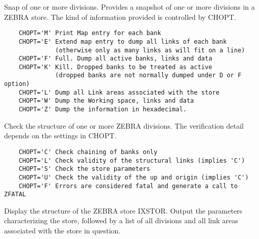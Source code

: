 \ENDCMD


\BEGARG
{}
\ENDARG

   \par
Snap of one or more divisions.  Provides a snapshot of one or more 
   divisions in a ZEBRA store.  The kind of information provided is controlled 
   by CHOPT.  
\begin{verbatim}
    CHOPT='M' Print Map entry for each bank
    CHOPT='E' Extend map entry to dump all links of each bank
              (otherwise only as many links as will fit on a line)
    CHOPT='F' Full. Dump all active banks, links and data
    CHOPT='K' Kill. Dropped banks to be treated as active
              (dropped banks are not normally dumped under D or F option)
    CHOPT='L' Dump all Link areas associated with the store
    CHOPT='W' Dump the Working space, links and data
    CHOPT='Z' Dump the information in hexadecimal.
\end{verbatim}

\ENDCMD


\BEGARG
{}
\ENDARG

   \par
Check the structure of one or more ZEBRA divisions.  The verification 
   detail depends on the settings in CHOPT.  
\begin{verbatim}
    CHOPT='C' Check chaining of banks only
    CHOPT='L' Check validity of the structural links (implies 'C')
    CHOPT='S' Check the store parameters
    CHOPT='U' Check the validity of the up and origin (implies 'C')
    CHOPT='F' Errors are considered fatal and generate a call to ZFATAL
\end{verbatim}

\ENDCMD


\BEGARG
{}
\ENDARG

   \par
Display the structure of the ZEBRA store IXSTOR.  Output the parameters 
   characterizing the store, followed by a list of all divisions and all link 
   areas associated with the store in question.  

